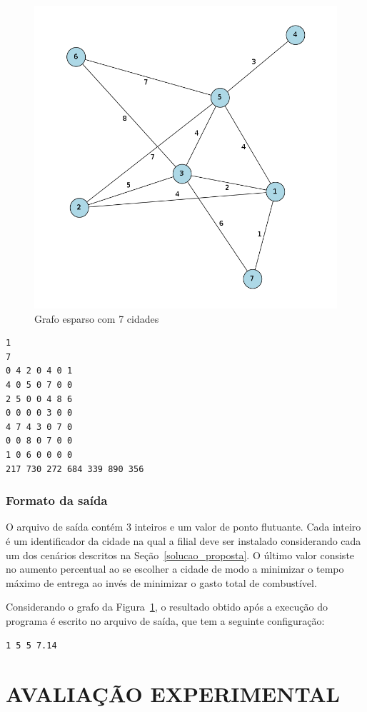\documentclass[12pt]{article}
\begin{document}
\begin{figure}[h!]
	\centering
	\includegraphics[width=.8\textwidth]{graph_teste.png}
	\caption{Grafo esparso com 7 cidades}
	\label{grafo}
\end{figure}


\begin{verbatim}
1
7
0 4 2 0 4 0 1
4 0 5 0 7 0 0
2 5 0 0 4 8 6
0 0 0 0 3 0 0
4 7 4 3 0 7 0
0 0 8 0 7 0 0
1 0 6 0 0 0 0
217 730 272 684 339 890 356
\end{verbatim}

\subsubsection{Formato da saída}

O arquivo de saída contém 3 inteiros e um valor de ponto flutuante. Cada inteiro é um identificador da cidade na qual a filial deve ser instalado considerando cada um dos cenários descritos na Seção~\ref{solucao_proposta}. O último valor consiste no aumento percentual ao se escolher a cidade de modo a minimizar o tempo máximo de entrega ao invés de minimizar o gasto total de combustível.

Considerando o grafo da Figura~\ref{grafo}, o resultado obtido após a execução do programa é escrito no arquivo de saída, que tem a seguinte configuração:

\begin{verbatim}
1 5 5 7.14
\end{verbatim}


\section{AVALIAÇÃO EXPERIMENTAL}
\label{avaliacao_experimental}
\end{document}
